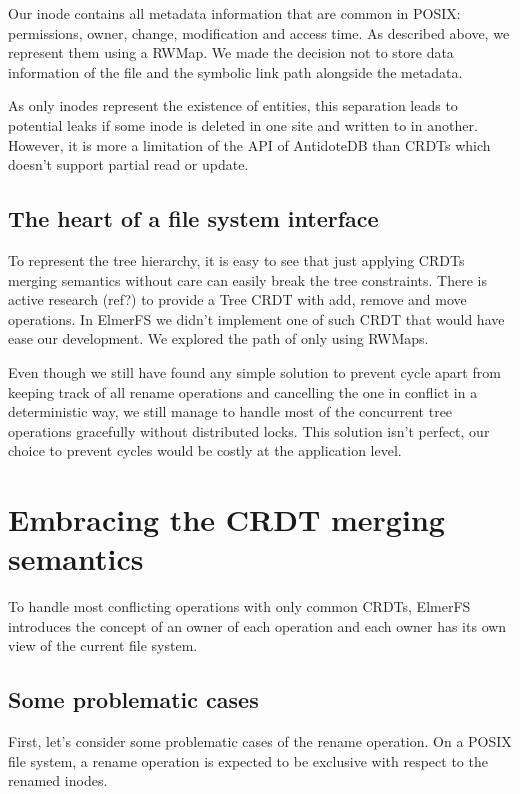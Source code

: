 \documentclass[sigplan, 10pt]{acmart}
\begin{document}
Our inode contains all metadata information that are common in POSIX:
permissions, owner, change, modification and access
time. As described above, we represent them using a RWMap.
We made the decision not to store data information of the file and the
symbolic link path alongside the metadata.

As only inodes represent the existence of entities, this separation leads to
potential leaks if some inode is deleted in one site and written to in another.
However, it is more a limitation of the API of AntidoteDB than CRDTs which
doesn't support partial read or update.

\subsection{The heart of a file system interface}

To represent the tree hierarchy, it is easy to see that just applying CRDTs merging semantics
without care can easily break the tree constraints.
There is active research (ref?) to provide a Tree CRDT with add, remove and move operations.
In ElmerFS we didn't implement one of such CRDT that would have ease our
development. We explored the path of only using RWMaps.

Even though we still have found any simple solution to prevent cycle apart from
keeping track of all rename operations and cancelling the
one in conflict in a deterministic way, we still manage to handle
most of the concurrent tree operations gracefully without distributed locks.
This solution isn't perfect, our choice to prevent cycles would be costly at
the application level.

\section{Embracing the CRDT merging semantics}

To handle most conflicting operations with only common
CRDTs, ElmerFS introduces the concept of an owner of each operation and
each owner has its own view of the current file system.

\subsection{Some problematic cases}

First, let's consider some problematic cases of the rename operation.
On a POSIX file system, a rename operation is expected to be exclusive
with respect to the renamed inodes.
\end{document}
